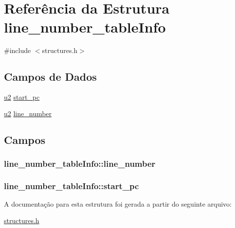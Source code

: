\hypertarget{structline__number__tableInfo}{}\section{Referência da Estrutura line\+\_\+number\+\_\+table\+Info}
\label{structline__number__tableInfo}


{\ttfamily \#include $<$structures.\+h$>$}

\subsection*{Campos de Dados}
\begin{DoxyCompactItemize}
\item 
\hyperlink{lista__operandos_8h_a732cde1300aafb73b0ea6c2558a7a54f}{u2} \hyperlink{structline__number__tableInfo_a09fe2870e59f80caeeb2b2473e9c07f0}{start\+\_\+pc}
\item 
\hyperlink{lista__operandos_8h_a732cde1300aafb73b0ea6c2558a7a54f}{u2} \hyperlink{structline__number__tableInfo_a3c73371368db11b50865dd474b9e2a7b}{line\+\_\+number}
\end{DoxyCompactItemize}


\subsection{Campos}
\subsubsection[{\texorpdfstring{line\+\_\+number}{line_number}}]{ line\+\_\+number\+\_\+table\+Info\+::line\+\_\+number}\hypertarget{structline__number__tableInfo_a3c73371368db11b50865dd474b9e2a7b}{}\label{structline__number__tableInfo_a3c73371368db11b50865dd474b9e2a7b}
\subsubsection[{\texorpdfstring{start\+\_\+pc}{start_pc}}]{ line\+\_\+number\+\_\+table\+Info\+::start\+\_\+pc}\hypertarget{structline__number__tableInfo_a09fe2870e59f80caeeb2b2473e9c07f0}{}\label{structline__number__tableInfo_a09fe2870e59f80caeeb2b2473e9c07f0}


A documentação para esta estrutura foi gerada a partir do seguinte arquivo\+:\begin{DoxyCompactItemize}
\item 
\hyperlink{structures_8h}{structures.\+h}\end{DoxyCompactItemize}
